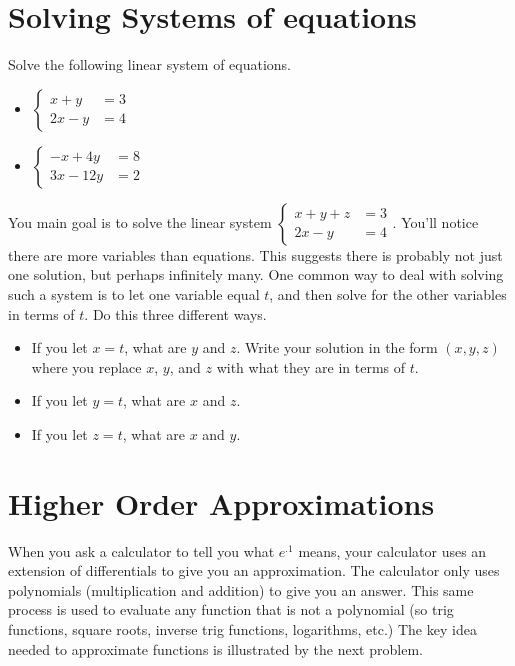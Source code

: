 \section{Solving Systems of equations}


\begin{problem}
Solve the following linear system of equations.
\begin{itemize}
\item $\begin{cases}x+y&=3\\2x-y&=4\end{cases}$
\item $\begin{cases}-x + 4y&=8\\3x - 12y&=2\end{cases}$
\end{itemize}
\end{problem}

\begin{problem}
You main goal is to solve the linear system 
$\begin{cases}x+y+z&=3\\2x-y&=4\end{cases}$.  
You'll notice there are more variables than equations. This suggests there is probably not just one solution, but perhaps infinitely many.  One common way to deal with solving such a system is to let one variable equal $t$, and then solve for the other variables in terms of $t$. Do this three different ways.
\begin{itemize}
\item If you let $x=t$, what are $y$ and $z$.  Write your solution in the form $(x,y,z)$ where you replace $x$, $y$, and $z$ with what they are in terms of $t$.
\item If you let $y=t$, what are $x$ and $z$.
\item If you let $z=t$, what are $x$ and $y$.
\end{itemize}
\end{problem}


\section{Higher Order Approximations} 
When you ask a calculator to tell you what $e^{.1}$ means, your calculator uses an extension of differentials to give you an approximation.  The calculator only uses polynomials (multiplication and addition) to give you an answer.  This same process is used to evaluate any function that is not a polynomial (so trig functions, square roots, inverse trig functions, logarithms, etc.) 
The key idea needed to approximate functions is illustrated by the next problem.

